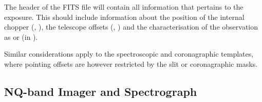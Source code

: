 The header of the FITS file will contain all information that pertains
to the exposure. This should include information about the position of
the internal chopper (,
), the telescope offsets (,
) and the characterisation of the observation as
 or  (in ).

Similar considerations apply to the spectroscopic and coronagraphic
templates, where pointing offsets are however restricted by the slit
or coronagraphic masks.


\subsection{NQ-band Imager and Spectrograph}
\label{ssec:instrument_data_NQ-IMG}

